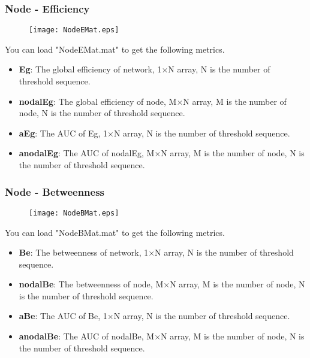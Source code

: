 \documentclass[11pt]{article}
\begin{document}
			\subsubsection{Node - Efficiency}
				\begin{figure}
					\begin{center}
						\texttt{[image: NodeEMat.eps]}
					\end{center}
				\end{figure}
				You can load "NodeEMat.mat" to get the following metrics.
				\begin{itemize}
					\item \textbf{Eg}: The global efficiency of network,
						1$\times$N array, N is the number of threshold sequence.
					\item \textbf{nodalEg}: The global efficiency of node,
						M$\times$N array, M is the number of node, N is the number of threshold sequence.
					\item \textbf{aEg}: The AUC of Eg,
						1$\times$N array, N is the number of threshold sequence.
					\item \textbf{anodalEg}: The AUC of nodalEg,
						M$\times$N array, M is the number of node, N is the number of threshold sequence.
				\end{itemize}
			\subsubsection{Node - Betweenness}
				\begin{figure}
					\begin{center}
						\texttt{[image: NodeBMat.eps]}
					\end{center}
				\end{figure}
				You can load "NodeBMat.mat" to get the following metrics.
				\begin{itemize}
					\item \textbf{Be}: The betweenness of network,
						1$\times$N array, N is the number of threshold sequence.
					\item \textbf{nodalBe}: The betweenness of node,
						M$\times$N array, M is the number of node, N is the number of threshold sequence.
					\item \textbf{aBe}: The AUC of Be,
						1$\times$N array, N is the number of threshold sequence.
					\item \textbf{anodalBe}: The AUC of nodalBe,
						M$\times$N array, M is the number of node, N is the number of threshold sequence.
				\end{itemize}
\end{document}
